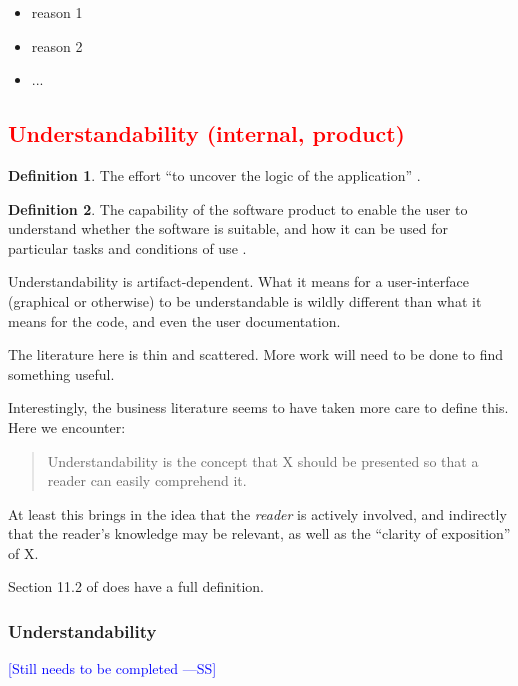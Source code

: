 \documentclass[letterpaper, cleveref]{lipics-v2019}
\newcommand{\authornote}[3]{\textcolor{#1}{[#3 ---#2]}}
\newcommand{\authornote}[3]{}
\newcommand{\wss}[1]{\authornote{blue}{SS}{#1}} %
\newcommand{\jc}[1]{\authornote{red}{JC}{#1}} %
\newcommand{\notdone}[1]{\textcolor{red}{#1}}
\theoremstyle{definition}
\newtheorem{defn}{Definition}
\begin{document}
\begin{itemize}
  \item reason 1
  \item reason 2
  \item ...
\end{itemize}


\subsection{\notdone{Understandability (internal, product)}} %

\begin{defn}
  The effort ``to uncover the logic of the application''
  \citep{ghezzi1991fundamentals}.
\end{defn}

\begin{defn}
  The capability of the software product to enable the user to understand
  whether the software is suitable, and how it can be used for particular tasks
  and conditions of use \cite{ISO9126}. %
\end{defn}

Understandability is artifact-dependent.  What it means for a user-interface
(graphical or otherwise) to be understandable is wildly different than what
it means for the code, and even the user documentation.

The literature here is thin and scattered.  More work will need to be done
to find something useful.

Interestingly, the business literature seems to have taken more care to
define this.  Here we encounter:

\begin{quote}
  Understandability is the concept that X should be presented so that a reader
  can easily comprehend it.
\end{quote}

At least this brings in the idea that the \emph{reader} is actively involved,
and indirectly that the reader's knowledge may be relevant, as well as the
``clarity of exposition'' of X.

Section 11.2 of \citet{adams2015nonfunctional} does have a full definition.

\begin{mybox}
\subsubsection*{Understandability}
\wss{Still needs to be completed}
\end{mybox}
\end{document}
